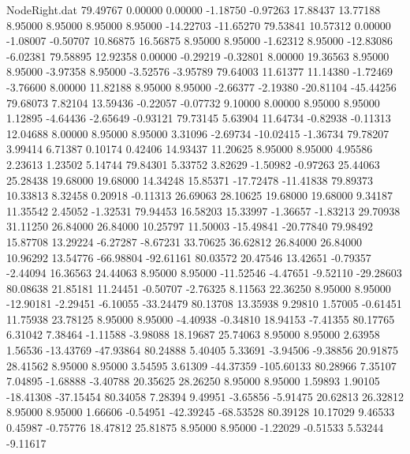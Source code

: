 \begin{filecontents}{NodeRight.dat}
  79.49767    0.00000    0.00000    -1.18750   -0.97263   17.88437   13.77188    8.95000    8.95000    8.95000    8.95000  -14.22703  -11.65270
  79.53841   10.57312    0.00000    -1.08007   -0.50707   10.86875   16.56875    8.95000    8.95000   -1.62312    8.95000  -12.83086   -6.02381
  79.58895   12.92358    0.00000    -0.29219   -0.32801    8.00000   19.36563    8.95000    8.95000   -3.97358    8.95000   -3.52576   -3.95789
  79.64003   11.61377   11.14380    -1.72469   -3.76600    8.00000   11.82188    8.95000    8.95000   -2.66377   -2.19380  -20.81104  -45.44256
  79.68073    7.82104   13.59436    -0.22057   -0.07732    9.10000    8.00000    8.95000    8.95000    1.12895   -4.64436   -2.65649   -0.93121
  79.73145    5.63904   11.64734    -0.82938   -0.11313   12.04688    8.00000    8.95000    8.95000    3.31096   -2.69734  -10.02415   -1.36734
  79.78207    3.99414    6.71387     0.10174    0.42406   14.93437   11.20625    8.95000    8.95000    4.95586    2.23613    1.23502    5.14744
  79.84301    5.33752    3.82629    -1.50982   -0.97263   25.44063   25.28438   19.68000   19.68000   14.34248   15.85371  -17.72478  -11.41838
  79.89373   10.33813    8.32458     0.20918   -0.11313   26.69063   28.10625   19.68000   19.68000    9.34187   11.35542    2.45052   -1.32531
  79.94453   16.58203   15.33997    -1.36657   -1.83213   29.70938   31.11250   26.84000   26.84000   10.25797   11.50003  -15.49841  -20.77840
  79.98492   15.87708   13.29224    -6.27287   -8.67231   33.70625   36.62812   26.84000   26.84000   10.96292   13.54776  -66.98804  -92.61161
  80.03572   20.47546   13.42651    -0.79357   -2.44094   16.36563   24.44063    8.95000    8.95000  -11.52546   -4.47651   -9.52110  -29.28603
  80.08638   21.85181   11.24451    -0.50707   -2.76325    8.11563   22.36250    8.95000    8.95000  -12.90181   -2.29451   -6.10055  -33.24479
  80.13708   13.35938    9.29810     1.57005   -0.61451   11.75938   23.78125    8.95000    8.95000   -4.40938   -0.34810   18.94153   -7.41355
  80.17765    6.31042    7.38464    -1.11588   -3.98088   18.19687   25.74063    8.95000    8.95000    2.63958    1.56536  -13.43769  -47.93864
  80.24888    5.40405    5.33691    -3.94506   -9.38856   20.91875   28.41562    8.95000    8.95000    3.54595    3.61309  -44.37359 -105.60133
  80.28966    7.35107    7.04895    -1.68888   -3.40788   20.35625   28.26250    8.95000    8.95000    1.59893    1.90105  -18.41308  -37.15454
  80.34058    7.28394    9.49951    -3.65856   -5.91475   20.62813   26.32812    8.95000    8.95000    1.66606   -0.54951  -42.39245  -68.53528
  80.39128   10.17029    9.46533     0.45987   -0.75776   18.47812   25.81875    8.95000    8.95000   -1.22029   -0.51533    5.53244   -9.11617

\end{filecontents}
